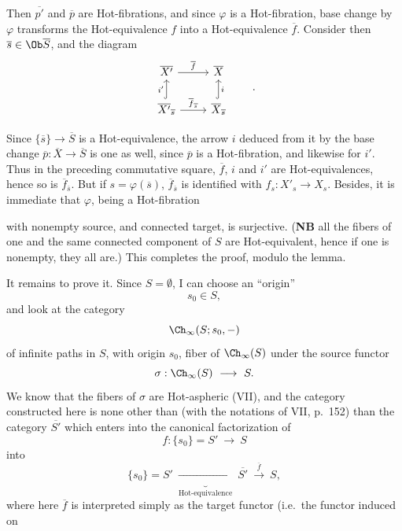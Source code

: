 Then $\overline{p'}$ and $\overline{p}$ are Hot-fibrations, and since $\varphi$ is a Hot-fibration, base change by $\varphi$ transforms the Hot-equivalence $f$ into a Hot-equivalence $\overline{f}$. Consider then $\overline{s} \in \Ob\overline{S}$, and the diagram
\[
\begin{tikzcd}
\overline{X'} \arrow[r, "\overline{f}"] & \overline{X} \\
\overline{X'}_{\overline{s}} \arrow[u, hook, "i'"] \arrow[r, "\overline{f}_{\overline{s}}"] & \overline{X}_{\overline{s}} \arrow[u, hook, "i"']
\end{tikzcd}
\qquad .
\]


Since $\{\overline{s}\} \longrightarrow \overline{S}$ is a Hot-equivalence, the arrow $i$ deduced from it by the base change $\overline{p} : \overline{X} \longrightarrow \overline{S}$ is one as well, since $\overline{p}$ is a Hot-fibration, and likewise for $i'$. Thus in the preceding commutative square, $\overline{f}$, $i$ and $i'$ are Hot-equivalences, hence so is $\overline{f}_{\overline{s}}$. But if $s = \varphi(\overline{s})$, $\overline{f}_{\overline{s}}$ is identified with $f_s : X'_s \longrightarrow X_s$. Besides, it is immediate that $\varphi$, being a Hot-fibration


with nonempty source, and connected target, is surjective. (\textbf{NB} all the fibers of one and the same connected component of $S$ are Hot-equivalent, hence if one is nonempty, they all are.) This completes the proof, modulo the lemma.

It remains to prove it. Since $S = \emptyset$, I can choose an ``origin''
\[
s_0 \in S,
\]
and look at the category
\[
\Ch_{\infty}(S; s_0, -)
\]
of infinite paths in $S$, with origin $s_0$, fiber of $\Ch_{\infty}(S)$ under the source functor
\[
\sigma : \Ch_{\infty}(S) \ \longrightarrow\ S.
\]
We know that the fibers of $\sigma$ are Hot-aspheric (VII), and the category constructed here is none other than (with the notations of VII, p.~152) than the category $\overline{S'}$ which enters into the canonical factorization of
\[
f : \{s_0\} = S' \ \longrightarrow\ S
\]
into
\[
\{s_0\} = S' \ \underbrace{\longrightarrow}_{\text{Hot-equivalence}}\ \overline{S'} \ \xrightarrow{\ \overline{f}\ }\ S,
\]
where here $\overline{f}$ is interpreted simply as the target functor (i.e.\ the functor induced on


